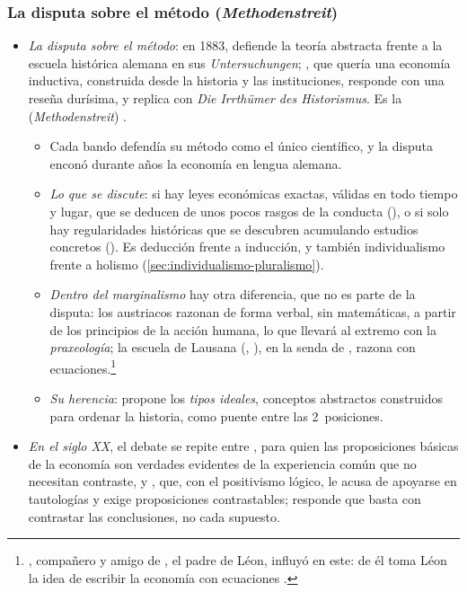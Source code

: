 \documentclass[11pt]{article}
\begin{document}
\subsubsection{La disputa sobre el método (\emph{Methodenstreit})}\label{sec:methodenstreit}

\begin{itemize}
\item \emph{La disputa sobre el método}: en 1883,  defiende la teoría abstracta frente a la escuela histórica alemana en sus \emph{Untersuchungen}\nocite{Menger1883Untersuchungen}; , que quería una economía inductiva, construida desde la historia y las instituciones, responde con una reseña durísima\nocite{Schmoller1883Methodologie}, y  replica con \emph{Die Irrthümer des Historismus}\nocite{Menger1884Irrthumer}. Es la  (\emph{Methodenstreit}) .
  \begin{itemize}
  \item Cada bando defendía su método como el único científico, y la disputa enconó durante años la economía en lengua alemana.
  \item \emph{Lo que se discute}: si hay leyes económicas exactas, válidas en todo tiempo y lugar, que se deducen de unos pocos rasgos de la conducta (), o si solo hay regularidades históricas que se descubren acumulando estudios concretos (). Es deducción frente a inducción, y también individualismo frente a holismo (\ref{sec:individualismo-pluralismo}).
  \item \emph{Dentro del marginalismo} hay otra diferencia, que no es parte de la disputa: los austriacos razonan de forma verbal, sin matemáticas, a partir de los principios de la acción humana, lo que \textcite{Mises1949Human} llevará al extremo con la \emph{praxeología}; la escuela de Lausana (, ), en la senda de , razona con ecuaciones.\footnote{, compañero y amigo de , el padre de Léon, influyó en este: de él toma Léon la idea de escribir la economía con ecuaciones .}
  \item \emph{Su herencia}:  propone los \emph{tipos ideales}, conceptos abstractos construidos para ordenar la historia, como puente entre las 2~posiciones\nocite{Weber1904Objektivitat}.
  \end{itemize}
\item \emph{En el siglo XX}, el debate se repite entre \textcite{Robbins1932Essay}, para quien las proposiciones básicas de la economía son verdades evidentes de la experiencia común que no necesitan contraste, y \textcite{Hutchison1938Significance}, que, con el positivismo lógico, le acusa de apoyarse en tautologías y exige proposiciones contrastables; \textcite{Machlup1955Verification} responde que basta con contrastar las conclusiones, no cada supuesto.
\end{itemize}
\end{document}
